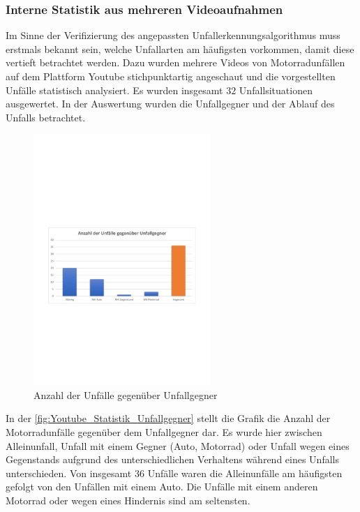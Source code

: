 %
%
%

\subsubsection{Interne Statistik aus mehreren Videoaufnahmen}



Im Sinne der Verifizierung des angepassten Unfallerkennungsalgorithmus muss erstmals bekannt sein, welche Unfallarten am häu\-figsten vorkommen, damit diese vertieft betrachtet werden. Dazu wurden mehrere Videos von Motorradunfällen auf dem Plattform \glqq Youtube\grqq{} stichpunktartig angeschaut und die vorgestellten Unfälle statistisch analysiert. Es wurden insgesamt $32$ Unfallsituationen ausgewertet. In der Auswertung wurden die Unfallgegner und der Ablauf des Unfalls betrachtet. \citep{YTMotoCrashComp} \citep{YTCrazyDriverVsBiker} \citep{YTMotoCrashedAndMishaps} \citep{YTAnimalsVsBikers} \citep{YTMotoCrashesRoad}


\begin{figure}
	\centering
	\includegraphics[width=0.6\textwidth]{Bilder/youtube_Statistik_Unfallgegner.pdf}
	\caption{Anzahl der Unfälle gegenüber Unfallgegner}
	\label{fig:Youtube_Statistik_Unfallgegner}
\end{figure}


In der \autoref{fig:Youtube_Statistik_Unfallgegner} stellt die Grafik die Anzahl der Motorradunfälle gegenüber dem Unfallgegner dar. Es wurde hier zwischen Alleinunfall, Unfall mit einem Gegner (Auto, Motorrad) oder Unfall wegen eines Gegenstands aufgrund des unterschiedlichen Verhaltens während eines Unfalls unterschieden. Von insgesamt 36 Unfälle waren die Alleinunfälle am häufigsten gefolgt von den Unfällen mit einem Auto. Die Unfälle mit einem anderen Motorrad oder wegen eines Hindernis sind am seltensten.
 
